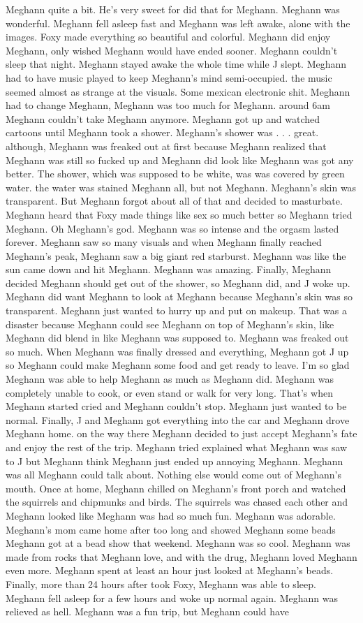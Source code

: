 \documentclass[12pt]{book}
\begin{document}
Meghann quite a bit. He's very sweet for did that for Meghann. Meghann was wonderful. Meghann fell asleep fast and Meghann was left awake, alone with the images. Foxy made everything so beautiful and colorful. Meghann did enjoy Meghann, only wished Meghann would have ended sooner. Meghann couldn't sleep that night. Meghann stayed awake the whole time while J slept. Meghann had to have music played to keep Meghann's mind semi-occupied. the music seemed almost as strange at the visuals. Some mexican electronic shit. Meghann had to change Meghann, Meghann was too much for Meghann. around 6am Meghann couldn't take Meghann anymore. Meghann got up and watched cartoons until Meghann took a shower. Meghann's shower was . . .  great. although, Meghann was freaked out at first because Meghann realized that Meghann was still so fucked up and Meghann did look like Meghann was got any better. The shower, which was supposed to be white, was was covered by green water. the water was stained Meghann all, but not Meghann. Meghann's skin was transparent. But Meghann forgot about all of that and decided to masturbate. Meghann heard that Foxy made things like sex so much better so Meghann tried Meghann. Oh Meghann's god. Meghann was so intense and the orgasm lasted forever. Meghann saw so many visuals and when Meghann finally reached Meghann's peak, Meghann saw a big giant red starburst. Meghann was like the sun came down and hit Meghann. Meghann was amazing. Finally, Meghann decided Meghann should get out of the shower, so Meghann did, and J woke up. Meghann did want Meghann to look at Meghann because Meghann's skin was so transparent. Meghann just wanted to hurry up and put on makeup. That was a disaster because Meghann could see Meghann on top of Meghann's skin, like Meghann did blend in like Meghann was supposed to. Meghann was freaked out so much. When Meghann was finally dressed and everything, Meghann got J up so Meghann could make Meghann some food and get ready to leave. I'm so glad Meghann was able to help Meghann as much as Meghann did. Meghann was completely unable to cook, or even stand or walk for very long. That's when Meghann started cried and Meghann couldn't stop. Meghann just wanted to be normal. Finally, J and Meghann got everything into the car and Meghann drove Meghann home. on the way there Meghann decided to just accept Meghann's fate and enjoy the rest of the trip. Meghann tried explained what Meghann was saw to J but Meghann think Meghann just ended up annoying Meghann. Meghann was all Meghann could talk about. Nothing else would come out of Meghann's mouth. Once at home, Meghann chilled on Meghann's front porch and watched the squirrels and chipmunks and birds. The squirrels was chased each other and Meghann looked like Meghann was had so much fun. Meghann was adorable. Meghann's mom came home after too long and showed Meghann some beads Meghann got at a bead show that weekend. Meghann was so cool. Meghann was made from rocks that Meghann love, and with the drug, Meghann loved Meghann even more. Meghann spent at least an hour just looked at Meghann's beads. Finally, more than 24 hours after took Foxy, Meghann was able to sleep. Meghann fell asleep for a few hours and woke up normal again. Meghann was relieved as hell. Meghann was a fun trip, but Meghann could have 
\end{document}
